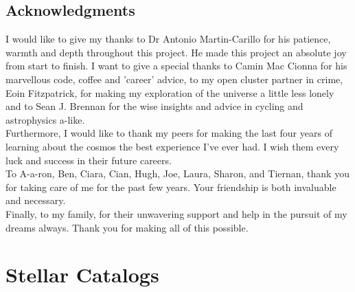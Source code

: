 \documentclass[twocolumn]{aastex631}
\begin{document}


\begin{acknowledgments}
    \section*{Acknowledgments}
    I would like to give my thanks to Dr Antonio Martin-Carillo for his patience, warmth and depth throughout this project. He made this project an absolute joy from start to finish. I want to give a special thanks to Camin Mac Cionna for his marvellous code, coffee and 'career' advice, to my open cluster partner in crime, Eoin Fitzpatrick, for making my exploration of the universe a little less lonely and to Sean J. Brennan for the wise insights and advice in cycling and astrophysics a-like. \\ 
    Furthermore, I would like to thank my peers for making the last four years of learning about the cosmos the best experience I've ever had. I wish them every luck and success in their future careers. \\
To A-a-ron, Ben, Ciara, Cian, Hugh, Joe, Laura, Sharon, and Tiernan, thank you for taking care of me for the past few years. Your friendship is both invaluable and necessary. 
 \\ Finally, to my family, for their unwavering support and help in the pursuit of my dreams always. Thank you for making all of this possible. \\

\end{acknowledgments}

\clearpage 

{}








\clearpage

\appendix

\section{Stellar Catalogs} \label{sec:star_catalog}

\end{document}
